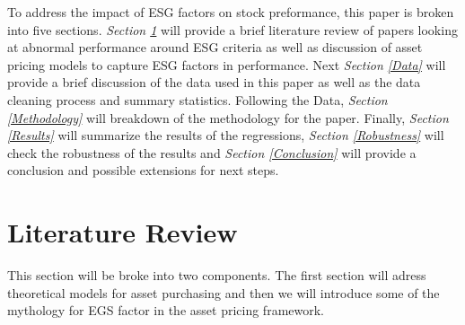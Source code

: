 \documentclass[12pt,oneside,reqno]{amsart}
\begin{document}
To address the impact of ESG factors on stock preformance, this paper is broken into five sections. \textit{Section \ref{Literature}} will provide a  brief literature review of papers looking at abnormal performance around ESG criteria as well as discussion of asset pricing models to capture ESG factors in performance. Next \textit{ Section \ref{Data}}  will provide a brief discussion of the data used in this paper as well as the data cleaning process and summary statistics. Following the Data, \textit{Section \ref{Methodology}} will breakdown of the methodology for the paper. Finally, \textit{Section \ref{Results}}  will summarize the results of the regressions, \textit{Section \ref{Robustness}} will check the robustness of the results and \textit{Section \ref{Conclusion}} will provide a conclusion and possible extensions for next steps. 

\section{Literature Review}
\label{Literature}
This section will be broke into two components. The first section will adress  theoretical models for asset purchasing and then we will introduce some of the mythology for  EGS factor in the asset pricing framework.\\
\end{document}
